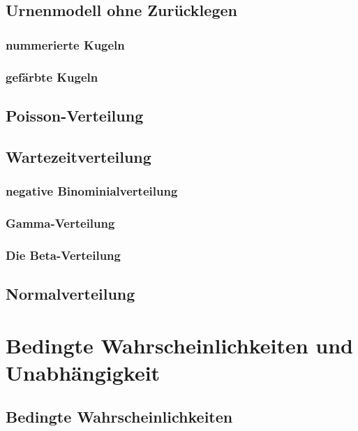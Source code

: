 \documentclass[a4paper,12pt]{article}%
\begin{document}
	\subsection{Urnenmodell ohne Zurücklegen}
	\subsubsection{nummerierte Kugeln}
	\subsubsection{gefärbte Kugeln}
	\subsection{Poisson-Verteilung}
	\subsection{Wartezeitverteilung}
	\subsubsection{negative Binominialverteilung}
	\subsubsection{Gamma-Verteilung}
	\subsubsection{Die Beta-Verteilung}
	\subsection{Normalverteilung}
	\newpage
	\section{Bedingte Wahrscheinlichkeiten und Unabhängigkeit}
	\subsection{Bedingte Wahrscheinlichkeiten}
	
\end{document}
